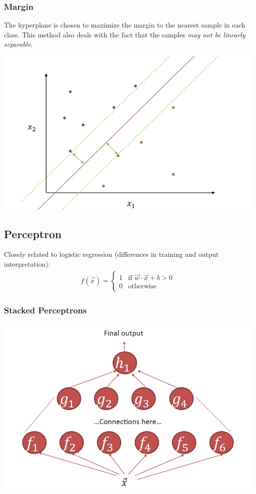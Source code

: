 \documentclass{article}
\begin{document}
\subsubsection{Margin}
The hyperplane is chosen to maximize the margin to the nearest sample in each class. This method also deals with the fact that the samples \textit{may not be linearly separable}.
\begin{center}
    \includegraphics[scale = 0.75]{svm_boundary.jpg}
\end{center}
\subsection{Perceptron}
Closely related to logistic regression (differences in training and output interpretation):
\begin{align}
    f(\vec{x}) = \begin{cases}
    1 & \text{if } \vec{w} \cdot \vec{x} + b > 0\\
    0 & \text{otherwise}
    \end{cases}
\end{align}
\subsubsection{Stacked Perceptrons}
\begin{center}
    \includegraphics[scale=0.5]{stacked_percepton.jpg}
\end{center}
\end{document}

